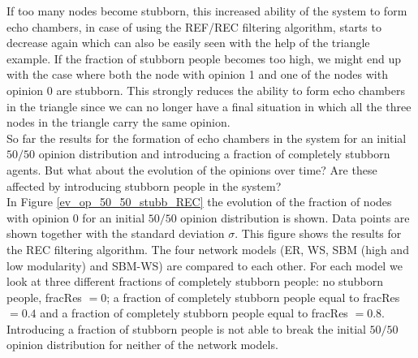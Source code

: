 \documentclass[11 pt , letterpaper , twoside , openright]{book}
\begin{document}
If too many nodes become stubborn, this increased ability of the system to form echo chambers, in case of using the REF/REC filtering algorithm, starts to decrease again which can also be easily seen with the help of the triangle example. If the fraction of stubborn people becomes too high, we might end up with the case where both the node with opinion 1 and one of the nodes with opinion 0 are stubborn. This strongly reduces the ability to form echo chambers in the triangle since we can no longer have a final situation in which all the three nodes in the triangle carry the same opinion.\\
\newline
So far the results for the formation of echo chambers in the system for an initial $50/50$ opinion distribution and introducing a fraction of completely stubborn agents. But what about the evolution of the opinions over time? Are these affected by introducing stubborn people in the system? \\
\newline
In Figure \ref{ev_op_50_50_stubb_REC} the evolution of the fraction of nodes with opinion 0 for an initial $50/50$ opinion distribution is shown. Data points are shown together with the standard deviation $\sigma$. This figure shows the results for the REC filtering algorithm. The four network models (ER, WS, SBM (high and low modularity) and SBM-WS) are compared to each other. For each model we look at three different fractions of completely stubborn people: no stubborn people, fracRes $=0$; a fraction of completely stubborn people equal to fracRes $=0.4$ and a fraction of completely stubborn people equal to fracRes $=0.8$. Introducing a fraction of stubborn people is not able to break the initial $50/50$ opinion distribution for neither of the network models.\\
\end{document}
